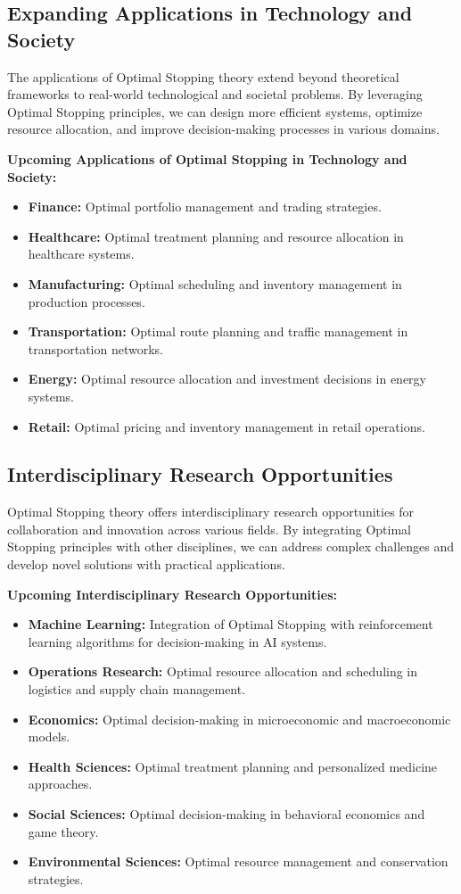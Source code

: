 \documentclass[12pt]{book} %
\begin{document}
\subsection{Expanding Applications in Technology and Society}

The applications of Optimal Stopping theory extend beyond theoretical frameworks to real-world technological and societal problems. By leveraging Optimal Stopping principles, we can design more efficient systems, optimize resource allocation, and improve decision-making processes in various domains.

\textbf{Upcoming Applications of Optimal Stopping in Technology and Society:}
\begin{itemize}
    \item \textbf{Finance:} Optimal portfolio management and trading strategies.
    \item \textbf{Healthcare:} Optimal treatment planning and resource allocation in healthcare systems.
    \item \textbf{Manufacturing:} Optimal scheduling and inventory management in production processes.
    \item \textbf{Transportation:} Optimal route planning and traffic management in transportation networks.
    \item \textbf{Energy:} Optimal resource allocation and investment decisions in energy systems.
    \item \textbf{Retail:} Optimal pricing and inventory management in retail operations.
\end{itemize}

\subsection{Interdisciplinary Research Opportunities}

Optimal Stopping theory offers interdisciplinary research opportunities for collaboration and innovation across various fields. By integrating Optimal Stopping principles with other disciplines, we can address complex challenges and develop novel solutions with practical applications.

\textbf{Upcoming Interdisciplinary Research Opportunities:}
\begin{itemize}
    \item \textbf{Machine Learning:} Integration of Optimal Stopping with reinforcement learning algorithms for decision-making in AI systems.
    \item \textbf{Operations Research:} Optimal resource allocation and scheduling in logistics and supply chain management.
    \item \textbf{Economics:} Optimal decision-making in microeconomic and macroeconomic models.
    \item \textbf{Health Sciences:} Optimal treatment planning and personalized medicine approaches.
    \item \textbf{Social Sciences:} Optimal decision-making in behavioral economics and game theory.
    \item \textbf{Environmental Sciences:} Optimal resource management and conservation strategies.
\end{itemize}
\end{document}
